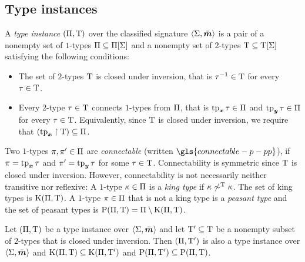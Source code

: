 \subsection{Type instances}
\begin{definition}\label{def:tpinst-twovar}
A \emph{type instance} $(\Pi,\mathrm{T})$ over the classified signature
$\left\langle \mathrm{\Sigma},\bar{\bm{m}} \right\rangle$ is a pair of a nonempty set of $1$-types
$\Pi\subseteq\Pi[\mathrm{\Sigma}]$ and a nonempty set of $2$-types $\mathrm{T}\subseteq\mathrm{T}[\mathrm{\Sigma}]$ satisfying the following conditions:
\begin{itemize}
  \item[\condtpii]
  The set of $2$-types $\mathrm{T}$ is closed under inversion, that is
  $\tau^{-1}\in\mathrm{T}$ for every $\tau\in\mathrm{T}$.
  \item[\condtpic]
  Every $2$-type $\tau\in\mathrm{T}$ connects $1$-types
  from $\Pi$, that is $\operatorname{tp}_{\bm{x}}\tau\in\Pi$ and $\operatorname{tp}_{\bm{y}}\tau\in\Pi$ for every
  $\tau\in\mathrm{T}$.
  Equivalently, since $\mathrm{T}$ is closed under inversion,
  we require that $(\operatorname{tp}_{\bm{x}}\restriction\mathrm{T})\subseteq\Pi$.
\end{itemize}
Two $1$-types $\pi, {\pi'} \in \Pi$ are \emph{connectable} 
(written $\gls{connectable-p-pp}$),
if $\pi = \operatorname{tp}_{\bm{x}}\tau$ and ${\pi'} = \operatorname{tp}_{\bm{y}}\tau$ for some $\tau \in \mathrm{T}$.
Connectability is symmetric since $\mathrm{T}$ is closed under inversion.
However, connectability is not necessarily neither transitive nor reflexive:
A $1$-type $\kappa \in \Pi$ is a \emph{king type} if 
$\kappa \not\sim^{\mathrm{T}}\kappa$. 
The set of king types is $\mathrm{K}(\Pi,\mathrm{T})$.
A $1$-type $\pi \in \Pi$ that is not a king type is a \emph{peasant type}
and the set of peasant types is $\mathrm{P}(\Pi,\mathrm{T}) = \Pi \setminus
\mathrm{K}(\Pi,\mathrm{T})$.
\end{definition}
\begin{remark}\label{rem:tpi-sub}
Let $(\Pi,\mathrm{T})$ be a type instance over $\left\langle \mathrm{\Sigma},\bar{\bm{m}} \right\rangle$ and let
${\mathrm{T}'} \subseteq \mathrm{T}$ be a nonempty subset of $2$-types that is closed 
under inversion. Then $(\Pi,{\mathrm{T}'})$ is also a type instance over
$\left\langle \mathrm{\Sigma},\bar{\bm{m}} \right\rangle$ and $\mathrm{K}(\Pi,\mathrm{T}) \subseteq \mathrm{K}(\Pi,{\mathrm{T}'})$ and
$\mathrm{P}(\Pi,{\mathrm{T}'}) \subseteq \mathrm{P}(\Pi,\mathrm{T})$.
\end{remark}

